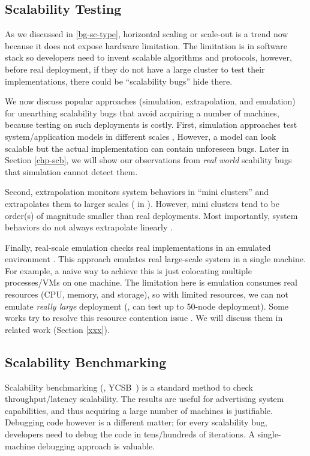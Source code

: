\subsection{Scalability Testing}

As we discussed in \ref{bg-sc-type}, horizontal scaling or scale-out is a trend
now because it does not expose hardware limitation. The limitation is in
software stack so developers need to invent scalable algorithms and protocols,
however, before real deployment, if they do not have a large cluster to test
their implementations, there could be ``scalability bugs'' hide there.

We now discuss popular approaches (simulation, extrapolation, and emulation) for
unearthing scalability bugs that avoid acquiring a number of machines, because
testing on such deployments is costly.
First, simulation approaches test system/application models in different scales
\cite{Calotoiu+13-ApmScaleBug, Laguna+15-DebugAtScale}, However, a model can
look scalable but the actual implementation can contain unforeseen bugs. Later
in Section \ref{chp-scb}, we will show our observations from \textit{real world}
scability bugs that simulation cannot detect them.

Second, extrapolation monitors system behaviors in ``mini clusters'' and
extrapolates them to larger scales ( in \cite{Wang+14-Exalt}). However,
mini clusters tend to be order(s) of magnitude smaller than real deployments.
Most importantly, system behaviors do not always extrapolate linearly
\cite{Wang+14-Exalt}. 

Finally, real-scale emulation checks real implementations in an emulated
environment \cite{Gupta+08-DieCast, Wang+14-Exalt}. This approach emulates real
large-scale system in a single machine. For example, a naive way to achieve this
is just colocating multiple processes/VMs on one machine. The limitation here is
emulation consumes real resources (CPU, memory, and storage), so with limited
resources, we can not emulate \textit{really large} deployment (\eg, can test up
to 50-node deployment). Some works try to resolve this resource contention issue
\cite{Gupta+08-DieCast, Wang+14-Exalt}. We will discuss them in related work
(Section \ref{xxx}).

\subsection{Scalability Benchmarking}

Scalability benchmarking (\eg, YCSB~\cite{Cooper+10-YCSB}) is a standard method
to check throughput/latency scalability.  The results are useful for
advertising system capabilities, and thus acquiring a large number of machines
is justifiable.  Debugging code however is a different matter; for every
scalability bug, developers need to debug the code in tens/hundreds of
iterations.  A single-machine debugging approach is valuable.

